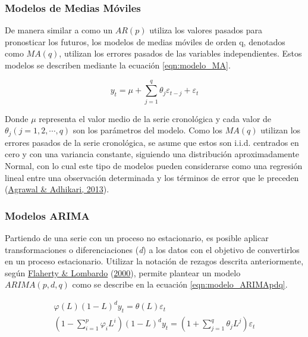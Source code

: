 \documentclass[
]{article}
\begin{document}
\subsubsection{Modelos de Medias Móviles}

De manera similar a como un \(AR(p)\) utiliza los valores pasados para
pronosticar los futuros, los modelos de medias móviles de orden q,
denotados como \(MA(q)\), utilizan los errores pasados de las variables
independientes. Estos modelos se describen mediante la ecuación
\eqref{eqn:modelo_MA}.

\begin{equation}
\label{eqn:modelo_MA}
y_t=\mu+\sum_{j=1}^q \theta_j \varepsilon_{t-j}+\varepsilon_t
\end{equation}

Donde \(\mu\) representa el valor medio de la serie cronológica y cada
valor de \(\theta_j(j=1,2,\cdots,q)\) son los parámetros del modelo.
Como los \(MA(q)\) utilizan los errores pasados de la serie cronológica,
se asume que estos son i.i.d. centrados en cero y con una variancia
constante, siguiendo una distribución aproximadamente Normal, con lo
cual este tipo de modelos pueden considerarse como una regresión lineal
entre una observación determinada y los términos de error que le
preceden (\protect\hyperlink{ref-stationary_def}{Agrawal \& Adhikari,
2013}).

\subsubsection{Modelos ARIMA}

Partiendo de una serie con un proceso no estacionario, es posible
aplicar transformaciones o diferenciaciones (\emph{d}) a los datos con
el objetivo de convertirlos en un proceso estacionario. Utilizar la
notación de rezagos descrita anteriormente, según
\protect\hyperlink{ref-Lombardo}{Flaherty \& Lombardo}
(\protect\hyperlink{ref-Lombardo}{2000}), permite plantear un modelo
\(ARIMA(p,d,q)\) como se describe en la ecuación
\eqref{eqn:modelo_ARIMApdq}.

\begin{equation}
\label{eqn:modelo_ARIMApdq}
\begin{array}{lll}
\varphi(L)(1-L)^dy_t=\theta(L)\varepsilon_t \\
\left(1-\sum_{i=1}^p \varphi_iL^i \right)(1-L)^d y_t=\left(1+\sum_{j=1}^q \theta_jL^j \right) \varepsilon_t
\end{array}
\end{equation}
\end{document}
